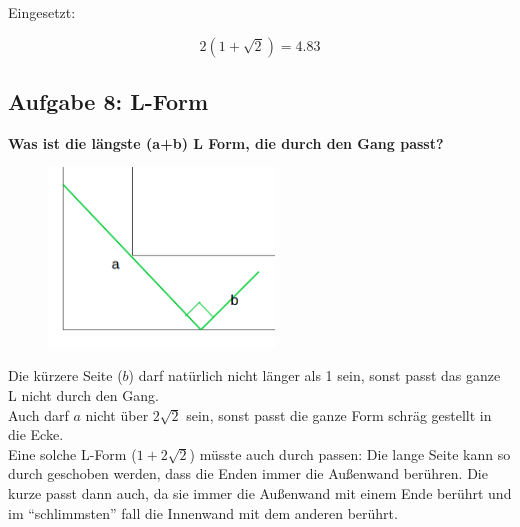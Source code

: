 \documentclass[a4paper,11pt]{article}
\begin{document}
Eingesetzt:

\[ 2(1+\sqrt{2})=4.83 \]

\subsection{Aufgabe 8: L-Form}
\textbf{Was ist die l\"angste (a+b) L Form, die durch den Gang passt?} \\

\begin{figure}[htbp] 
        \centering
        \includegraphics[width=6cm]{img/A8_1.png}
\end{figure}

Die kürzere Seite ($b$) darf natürlich nicht länger als 1 sein, sonst passt das ganze L nicht durch den Gang. \\
Auch darf $a$ nicht \"uber $2\sqrt{2}$ sein, sonst passt die ganze Form schräg gestellt in die Ecke. \\
Eine solche L-Form ($1+2\sqrt{2}$) müsste auch durch passen: Die lange Seite kann so durch geschoben werden, dass die Enden immer die Außenwand berühren. Die kurze passt dann auch, da sie immer die Außenwand mit einem Ende berührt und im ``schlimmsten'' fall die Innenwand mit dem anderen berührt.
\end{document}
